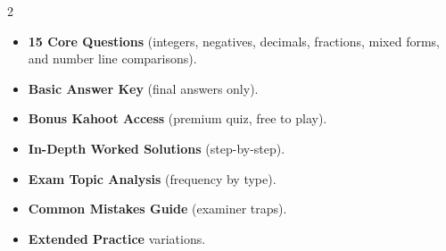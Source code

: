 \documentclass[11pt,a4paper]{article}
\newcommand{\FullReleaseDate}{April 30, 2026}
\begin{document}
\vspace{8pt}

\begin{multicols}{2}
  \begin{tcolorbox}[card, title=\sffamily\bfseries\textcolor{white}{\faHandPointDown\ TODAY (Simplified Version)}, colbacktitle=mainblue, boxed title style={sharp corners, boxrule=0pt}]
    \begin{itemize}[leftmargin=1.2em, itemsep=2pt]
      \item \small \textbf{15 Core Questions} (integers, negatives, decimals, fractions, mixed forms, and number line comparisons).
      \item \small \textbf{Basic Answer Key} (final answers only).
      \item \small \textbf{Bonus Kahoot Access} (premium quiz, free to play).
    \end{itemize}
  \end{tcolorbox}

  \columnbreak

  \begin{tcolorbox}[card, title=\sffamily\bfseries\textcolor{white}{\faRocket\ ON \FullReleaseDate\ (Full Upgrade)}, colbacktitle=mainblue, boxed title style={sharp corners, boxrule=0pt}]
    \begin{itemize}[leftmargin=1.2em, itemsep=2pt]
      \item \small \textbf{In-Depth Worked Solutions} (step-by-step).
      \item \small \textbf{Exam Topic Analysis} (frequency by type).
      \item \small \textbf{Common Mistakes Guide} (examiner traps).
      \item \small \textbf{Extended Practice} variations.
    \end{itemize}
  \end{tcolorbox}
\end{multicols}
\end{document}
